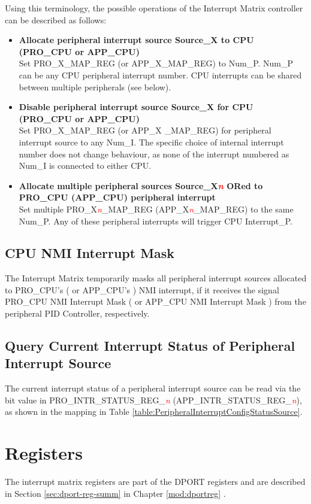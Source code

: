 \documentclass[main\_\_EN.tex]{subfiles}
\begin{document}
Using this terminology, the possible operations of the Interrupt Matrix controller can be described as follows:

\begin{itemize}

\item \textbf{Allocate peripheral interrupt source Source\_X to CPU (PRO\_CPU or APP\_CPU)}\\
Set PRO\_X\_MAP\_REG (or APP\_X\_MAP\_REG) to Num\_P. Num\_P can be any CPU peripheral interrupt number. CPU interrupts can be shared between multiple peripherals (see below).

\item \textbf{Disable peripheral interrupt source Source\_X for CPU (PRO\_CPU or APP\_CPU)}\\
Set PRO\_X\_MAP\_REG (or APP\_X \_MAP\_REG) for peripheral interrupt source to any Num\_I. The specific choice of internal interrupt number does not change behaviour, as none of the interrupt numbered as Num\_I is connected to either CPU.

\item \textbf{Allocate multiple peripheral sources Source\_X\textcolor{red}{\it{n}} ORed to PRO\_CPU (APP\_CPU) peripheral interrupt}\\
Set multiple PRO\_X\textcolor{red}{\it{n}}\_MAP\_REG (APP\_X\textcolor{red}{\it{n}}\_MAP\_REG) to the same Num\_P. Any of these peripheral interrupts will trigger CPU Interrupt\_P.

\end{itemize}

\subsection{CPU NMI Interrupt Mask}

The Interrupt Matrix temporarily masks all peripheral interrupt sources allocated to PRO\_CPU's ( or APP\_CPU's ) NMI interrupt, if it receives the signal PRO\_CPU NMI Interrupt Mask ( or APP\_CPU NMI Interrupt Mask ) from the peripheral PID Controller, respectively.

\subsection{Query Current Interrupt Status of Peripheral Interrupt Source}

The current interrupt status of a peripheral interrupt source can be read via the bit value in PRO\_INTR\_STATUS\_REG\_\textcolor{red}{\it{n}} (APP\_INTR\_STATUS\_REG\_\textcolor{red}{\it{n}}), as shown in the mapping in Table \ref{table:PeripheralInterruptConfigStatusSource}.

\section{Registers}
The interrupt matrix registers are part of the DPORT registers and are described in Section \ref{sec:dport-reg-summ} in Chapter \ref{mod:dportreg} \textit{}.
\end{document}
